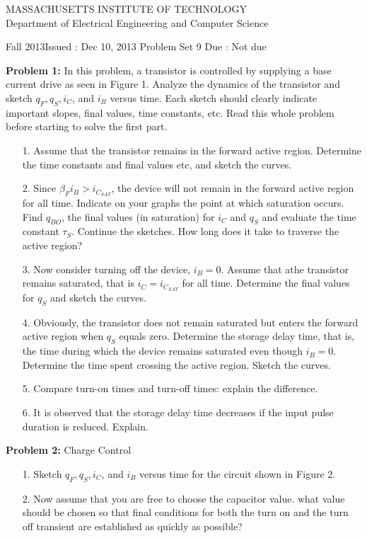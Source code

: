 \documentclass[10pt,twoside]{article}
\newlength{\toppush}
\newcommand{\htitle}[3]{\begin{center}
\vspace*{-\toppush}
{\large MASSACHUSETTS INSTITUTE OF TECHNOLOGY}\\
{\small Department of Electrical Engineering and Computer Science}\\
\vspace*{1ex}{\Large #2}\end{center}
\noindent
\newline\parbox{6.5in}
{Fall 2013\hfill Issued : #1 \newline
 Problem Set 9 \hfill Due : #3\newline
}}
\newcommand{\handout}[3]{\thispagestyle{empty}
\pagestyle{myheadings}\htitle{#1}{#2}{#3}}
\begin{document}
\handout{Dec 10, 2013}{6.301 Solid State Circuits}{Not due}
\setlength{\parindent}{0pt}

\newcommand{\solution}{
 \medskip
 {\bf Solution:}
}

\hrulefill

\flushleft
\vspace{3ex}
\hangindent=1cm {\bf Problem 1:} \quad In this problem, a transistor is controlled by supplying a base current drive as seen in Figure 1.
Analyze the dynamics of the transistor and sketch $q_F, q_S, i_C$, and $i_B$ versus time. Each sketch should
clearly indicate important slopes, final values, time constants, etc. Read this whole problem before
starting to solve the first part.
\begin{enumerate}
	\item[1.]
Assume that the transistor remains in the forward active region. Determine the time constants and
final values etc, and sketch the curves.
	\item[2.]
Since $\beta_Fi_B > i_{C_{SAT}}$, the device will not remain in the forward active region for all time. Indicate
on your graphs the point at which saturation occurs. Find $q_{BO}$, the final values (in saturation) for $i_C$ and $q_S$ and evaluate the time constant $\tau_S$.  Continue the sketches.  How long does it take to traverse the active region?
	\item[3.]
Now consider turning off the device, $i_B=0$.  Assume that athe transistor remains saturated, that is $i_C=i_{C_{SAT}}$ for all time.  Determine the final values for $q_S$ and sketch the curves.
	\item[4.]
Obviously, the transistor does not remain saturated but enters the forward active region when $q_S$ equals zero. Determine the storage delay time, that is, the time during which the device remains saturated even though $i_B=0$. Determine the time spent crossing the active region. Sketch the curves.
	\item[5.] Compare turn-on times and turn-off times: explain the difference.
	\item[6.] It is observed that the storage delay time decreases if the input pulse duration is reduced.  Explain.
\end{enumerate}
\vspace{2ex}
{\bf Problem 2:} Charge Control
\begin{enumerate}
	\item[1.] Sketch $q_F, q_S, i_C$, and $i_B$ versus time for the circuit shown in Figure 2.
	\item[2.] Now assume that you are free to choose the capacitor value. what value should be chosen so
that final conditions for both the turn on and the turn off transient are established as quickly as
possible?
\end{enumerate}
\clearpage
\end{document}
